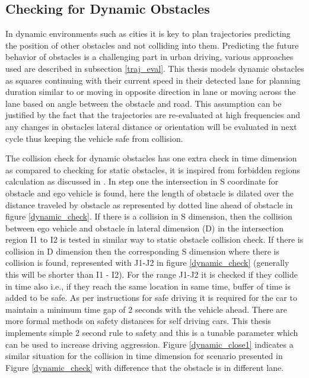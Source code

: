 \subsection{Checking for Dynamic Obstacles} \label{obstacle_check_dynamic}

In dynamic environments such as cities it is key to plan trajectories predicting the position of other obstacles and not colliding into them. Predicting the future behavior of obstacles
is a challenging part in urban driving, various approaches used are described in subsection \ref{traj_eval}. This thesis models dynamic obstacles as squares continuing with their current speed in their detected lane for planning duration similar to \cite{unit_A_star} or moving in opposite direction in lane or moving across the lane based on angle between the obstacle and road. This assumption can be justified by the fact that the trajectories are re-evaluated at high frequencies and any changes in obstacles lateral distance or orientation will be evaluated in next cycle thus keeping the vehicle safe from collision. 

The collision check for dynamic obstacles has one extra check in time dimension as compared to checking for static obstacles, it is inspired from forbidden regions calculation as discussed in \cite{graff_thesis}. In step one the intersection in S coordinate for obstacle and ego vehicle is found, here the length of obstacle is dilated over the distance traveled by obstacle as represented by dotted line ahead of obstacle in figure \ref{dynamic_check}. If there is a collision in S dimension, then the collision between ego vehicle and obstacle in lateral dimension (D) in the intersection region I1 to I2 is tested in similar way to static obstacle collision check. If there is collision in D dimension then the corresponding S dimension where there is collision is found, represented with J1-J2 in figure \ref{dynamic_check} (generally this will be shorter than I1 - I2). For the range J1-J2 it is checked if they collide in time also i.e., if they reach the same location in same time, buffer of time is added to be safe. As per instructions for safe driving it is required for the car to maintain a minimum time gap of 2 seconds with the vehicle ahead. There are more formal methods \cite{mobile_eye_safety_distance} on safety distances for self driving cars. This thesis implements simple 2 second rule to safety and this is a tunable parameter which can be used to increase driving aggression. Figure \ref{dynamic_close1} indicates a similar situation for the collision in time dimension for scenario presented in Figure \ref{dynamic_check} with difference that the obstacle is in different lane.

